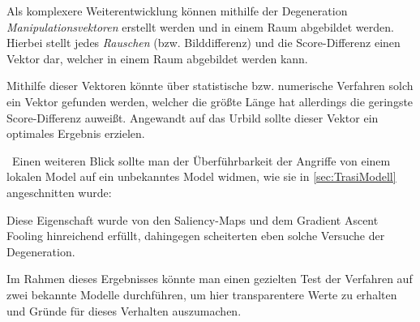 Als komplexere Weiterentwicklung können mithilfe der Degeneration \textit{Manipulationsvektoren} erstellt werden und in einem Raum abgebildet werden. Hierbei stellt jedes \textit{Rauschen} (bzw. Bilddifferenz) und die Score-Differenz einen Vektor dar, welcher in einem Raum abgebildet werden kann.   

Mithilfe dieser Vektoren könnte über statistische bzw. numerische Verfahren solch ein Vektor gefunden werden, welcher die größte Länge hat allerdings die geringste Score-Differenz auweißt. Angewandt auf das Urbild sollte dieser Vektor ein optimales Ergebnis erzielen.  

~\newline Einen weiteren Blick sollte man der Überführbarkeit der Angriffe von einem lokalen Model auf ein unbekanntes Model widmen, wie sie in \ref{sec:TrasiModell} angeschnitten wurde: 

Diese Eigenschaft wurde von den Saliency-Maps und dem Gradient Ascent Fooling hinreichend erfüllt, dahingegen scheiterten eben solche Versuche der Degeneration. 

Im Rahmen dieses Ergebnisses könnte man einen gezielten Test der Verfahren auf zwei bekannte Modelle durchführen, um hier transparentere Werte zu erhalten und Gründe für dieses Verhalten auszumachen. 
